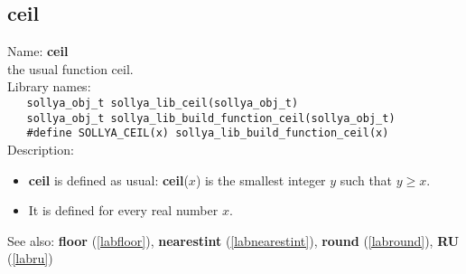 \subsection{ceil}
\label{labceil}
\noindent Name: \textbf{ceil}\\
\phantom{aaa}the usual function ceil.\\[0.2cm]
\noindent Library names:\\
\verb|   sollya_obj_t sollya_lib_ceil(sollya_obj_t)|\\
\verb|   sollya_obj_t sollya_lib_build_function_ceil(sollya_obj_t)|\\
\verb|   #define SOLLYA_CEIL(x) sollya_lib_build_function_ceil(x)|\\[0.2cm]
\noindent Description: \begin{itemize}

\item \textbf{ceil} is defined as usual: \textbf{ceil}($x$) is the smallest integer $y$ such that $y \ge x$.

\item It is defined for every real number $x$.
\end{itemize}
See also: \textbf{floor} (\ref{labfloor}), \textbf{nearestint} (\ref{labnearestint}), \textbf{round} (\ref{labround}), \textbf{RU} (\ref{labru})
